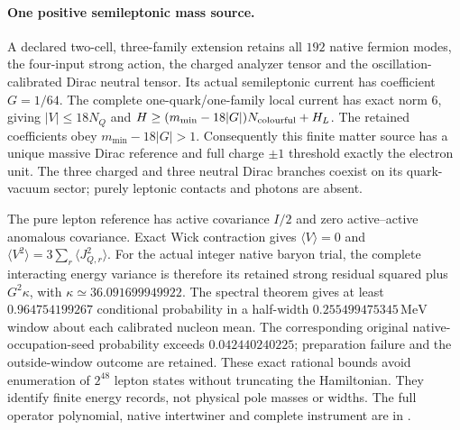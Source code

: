 \paragraph{One positive semileptonic mass source.}
A declared two-cell, three-family extension retains all $192$ native
fermion modes, the four-input strong action, the charged analyzer tensor
and the oscillation-calibrated Dirac neutral tensor. Its actual
semileptonic current has coefficient $G=1/64$. The complete
one-quark/one-family local current has exact norm $6$, giving
$|V|\leq18N_Q$ and
$H\geq(m_{\min}-18|G|)N_{\rm colourful}+H_L$.
The retained coefficients obey $m_{\min}-18|G|>1$.
Consequently this finite matter source has a unique massive Dirac
reference and full charge $\pm1$ threshold exactly the electron unit.
The three charged and three neutral Dirac branches coexist on its
quark-vacuum sector; purely leptonic contacts and photons are absent.

The pure lepton reference has active covariance $I/2$ and zero
active--active anomalous covariance. Exact Wick contraction gives
$\langle V\rangle=0$ and
$\langle V^2\rangle=3\sum_r\langle J_{Q,r}^2\rangle$.
For the actual integer native baryon trial, the complete interacting
energy variance is therefore its retained strong residual squared plus
$G^2\kappa$, with $\kappa\simeq36.091699949922$.
The spectral theorem gives at least $0.964754199267$
conditional probability in a half-width $0.255499475345\,\mathrm{MeV}$
window about each calibrated nucleon mean. The corresponding original
native-occupation-seed probability exceeds $0.042440240225$; preparation
failure and the outside-window outcome are retained.
These exact rational bounds avoid enumeration of $2^{48}$ lepton states
without truncating the Hamiltonian. They identify finite energy records,
not physical pole masses or widths. The full operator polynomial, native
intertwiner and complete instrument are in
.
